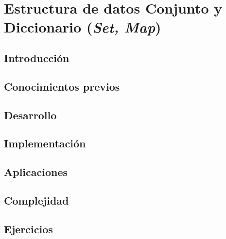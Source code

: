 \chapter{Estructura de datos Conjunto y Diccionario (\emph{Set, Map})}
\section{Introducción}

\section{Conocimientos previos}

\section{Desarrollo}

\section{Implementación}

\section{Aplicaciones}

\section{Complejidad}

\section{Ejercicios}
